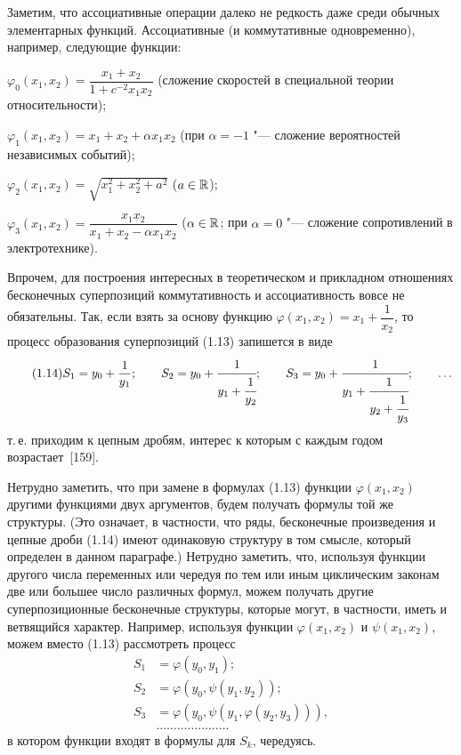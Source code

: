 Заметим, что ассоциативные операции далеко не редкость даже среди обычных
элементарных функций. Ассоциативные (и коммутативные одновременно),
например, следующие функции:

$\varphi_0(x_1,x_2)=\dfrac{x_1+x_2}{1+c^{-2}x_1x_2}$ (сложение скоростей
в специальной теории относительности);

$\varphi_1(x_1,x_2)=x_1+x_2+\alpha x_1x_2$ (при $\alpha=-1$ "--- сложение
вероятностей независимых событий);

$\varphi_2(x_1,x_2)=\sqrt{x_1^2+x_2^2+a^2}$ ($a\in\mathbb R$);

$\varphi_3(x_1,x_2)=\dfrac{x_1x_2}{x_1+x_2-\alpha x_1x_2}$ ($\alpha\in\mathbb R$;
при $\alpha=0$ "--- сложение сопротивлений в электротехнике).

Впрочем, для построения интересных в теоретическом и прикладном
отношениях бесконечных суперпозиций коммутативность и ассоциативность
вовсе не обязательны. Так, если взять за основу функцию
$\varphi(x_1,x_2)=x_1+\dfrac1{x_2}$, то процесс образования суперпозиций
(1.13) запишется в виде
\begin{equation}\tag{1.14}
S_1=y_0+\frac1{y_1};\qquad
S_2=y_0+\cfrac1{y_1+\cfrac1{y_2}};\qquad
S_3=y_0+\cfrac1{y_1+\cfrac1{y_2+\cfrac1{y_3}}};\qquad\dots
\end{equation}
%
т.\,е. приходим к цепным дробям, интерес к которым с каждым годом
возрастает~[159].

Нетрудно заметить, что при замене в формулах (1.13) функции
$\varphi(x_1,x_2)$ другими функциями двух аргументов, будем получать
формулы той же структуры. (Это означает, в частности, что ряды,
бесконечные произведения и цепные дроби (1.14) имеют одинаковую структуру
в том смысле, который определен в данном параграфе.) Нетрудно заметить,
что, используя функции другого числа переменных или чередуя по тем или
иным циклическим законам две или большее число различных формул, можем
получать другие суперпозиционные бесконечные структуры, которые могут,
в частности, иметь и ветвящийся характер. Например, используя функции
$\varphi(x_1,x_2)$ и $\psi(x_1,x_2)$, можем вместо (1.13) рассмотреть
процесс
\begin{equation}\tag{1.15}
\begin{aligned}
S_1&=\varphi(y_0,y_1);\\
S_2&=\varphi(y_0,\psi(y_1,y_2));\\
S_3&=\varphi(y_0,\psi(y_1,\varphi(y_2,y_3))),\\
&\dots\dots\dots\dots\dots\dots\dots
\end{aligned}
\end{equation}
в котором функции входят в формулы для $S_k$, чередуясь.


